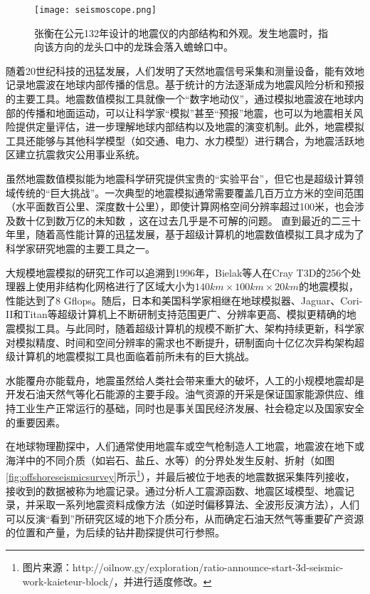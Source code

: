 \begin{figure}[ht]
\centering
\texttt{[image: seismoscope.png]}
\caption{张衡在公元132年设计的地震仪的内部结构和外观\citep{hsiao2009review}。发生地震时，指向该方向的龙头口中的龙珠会落入蟾蜍口中。}
\label{fig:heng-scope}
\end{figure}

随着20世纪科技的迅猛发展，人们发明了天然地震信号采集和测量设备，能有效地记录地震波在地球内部传播的信息。基于统计的方法逐渐成为地震风险分析和预报的主要工具。地震数值模拟工具就像一个“数字地动仪”，通过模拟地震波在地球内部的传播和地面运动，可以让科学家“模拟”甚至“预报”地震，也可以为地震相关风险提供定量评估，进一步理解地球内部结构以及地震的演变机制。此外，地震模拟工具还能够与其他科学模型（如交通、电力、水力模型）进行耦合，为地震活跃地区建立抗震救灾公用事业系统。

虽然地震数值模拟能为地震科学研究提供宝贵的“实验平台”，但它也是超级计算领域传统的“巨大挑战”。一次典型的地震模拟通常需要覆盖几百万立方米的空间范围（水平面数百公里、深度数十公里），即使计算网格空间分辨率超过100米，也会涉及数十亿到数万亿的未知数 \citep{cui2010scalable}，这在过去几乎是不可解的问题。 直到最近的二三十年里，随着高性能计算的迅猛发展，基于超级计算机的地震数值模拟工具才成为了科学家研究地震的主要工具之一。

大规模地震模拟的研究工作可以追溯到1996年，Bielak等人在Cray T3D的256个处理器上使用非结构化网格进行了区域大小为$140km \times 100km \times 20km$的地震模拟\citep{bao1996earthquake}，性能达到了8 Gflops。随后，日本和美国科学家相继在地球模拟器\cite{chen2006glueball}、Jaguar\cite{carrington2008high}、Cori-II\citep{breuer2017edge}和Titan\cite{cui2013physics}等超级计算机上不断研制支持范围更广、分辨率更高、模拟更精确的地震模拟工具。与此同时，随着超级计算机的规模不断扩大、架构持续更新，科学家对模拟精度、时间和空间分辨率的需求也不断提升，研制面向十亿亿次异构架构超级计算机的地震模拟工具也面临着前所未有的巨大挑战。


水能覆舟亦能载舟，地震虽然给人类社会带来重大的破坏，人工的小规模地震却是开发石油天然气等化石能源的主要手段。油气资源的开采是保证国家能源供应、维持工业生产正常运行的基础，同时也是事关国民经济发展、社会稳定以及国家安全的重要因素\cite{甘霖2016面向地球科学数值模拟的可重构计算方法研究}。

在地球物理勘探中，人们通常使用地震车或空气枪制造人工地震，地震波在地下或海洋中的不同介质（如岩石、盐丘、水等）的分界处发生反射、折射（如图\ref{fig:offshoreseismicsurvey}所示\footnote{图片来源：http://oilnow.gy/exploration/ratio-announce-start-3d-seismic-work-kaieteur-block/，并进行适度修改。}），并最后被位于地表的地震数据采集阵列接收，接收到的数据被称为地震记录。通过分析人工震源函数、地震区域模型、地震记录，并采取一系列地震资料成像方法（如逆时偏移算法、全波形反演方法），人们可以反演“看到”所研究区域的地下介质分布，从而确定石油天然气等重要矿产资源的位置和产量，为后续的钻井勘探提供可行参照。

